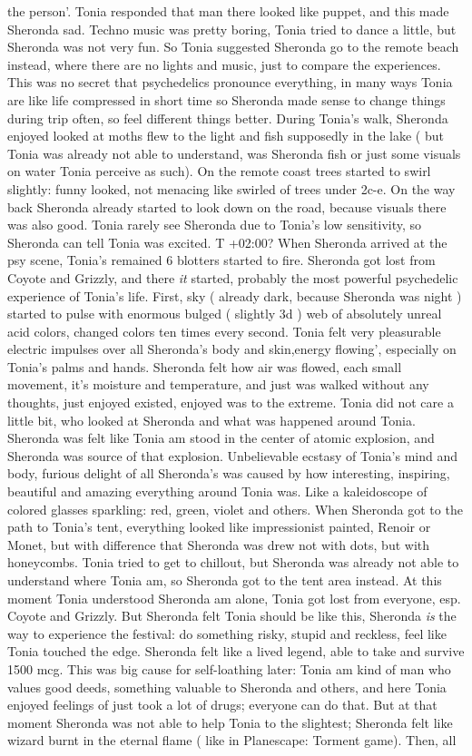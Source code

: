 \documentclass[12pt]{book}
\begin{document}
the person'. Tonia responded that man there looked like puppet, and this made Sheronda sad. Techno music was pretty boring, Tonia tried to dance a little, but Sheronda was not very fun. So Tonia suggested Sheronda go to the remote beach instead, where there are no lights and music, just to compare the experiences. This was no secret that psychedelics pronounce everything, in many ways Tonia are like life compressed in short time so Sheronda made sense to change things during trip often, so feel different things better. During Tonia's walk, Sheronda enjoyed looked at moths flew to the light and fish supposedly in the lake ( but Tonia was already not able to understand, was Sheronda fish or just some visuals on water Tonia perceive as such). On the remote coast trees started to swirl slightly: funny looked, not menacing like swirled of trees under 2c-e. On the way back Sheronda already started to look down on the road, because visuals there was also good. Tonia rarely see Sheronda due to Tonia's low sensitivity, so Sheronda can tell Tonia was excited. T +02:00? When Sheronda arrived at the psy scene, Tonia's remained 6 blotters started to fire. Sheronda got lost from Coyote and Grizzly, and there \emph{it} started, probably the most powerful psychedelic experience of Tonia's life. First, sky ( already dark, because Sheronda was night ) started to pulse with enormous bulged ( slightly 3d ) web of absolutely unreal acid colors, changed colors ten times every second. Tonia felt very pleasurable electric impulses over all Sheronda's body and skin,energy flowing', especially on Tonia's palms and hands. Sheronda felt how air was flowed, each small movement, it's moisture and temperature, and just was walked without any thoughts, just enjoyed existed, enjoyed was to the extreme. Tonia did not care a little bit, who looked at Sheronda and what was happened around Tonia. Sheronda was felt like Tonia am stood in the center of atomic explosion, and Sheronda was source of that explosion. Unbelievable ecstasy of Tonia's mind and body, furious delight of all Sheronda's was caused by how interesting, inspiring, beautiful and amazing everything around Tonia was. Like a kaleidoscope of colored glasses sparkling: red, green, violet and others. When Sheronda got to the path to Tonia's tent, everything looked like impressionist painted, Renoir or Monet, but with difference that Sheronda was drew not with dots, but with honeycombs. Tonia tried to get to chillout, but Sheronda was already not able to understand where Tonia am, so Sheronda got to the tent area instead. At this moment Tonia understood Sheronda am alone, Tonia got lost from everyone, esp. Coyote and Grizzly. But Sheronda felt Tonia should be like this, Sheronda \emph{is} the way to experience the festival: do something risky, stupid and reckless, feel like Tonia touched the edge. Sheronda felt like a lived legend, able to take and survive 1500 mcg. This was big cause for self-loathing later: Tonia am kind of man who values good deeds, something valuable to Sheronda and others, and here Tonia enjoyed feelings of just took a lot of drugs; everyone can do that. But at that moment Sheronda was not able to help Tonia to the slightest; Sheronda felt like wizard burnt in the eternal flame ( like in Planescape: Torment game). Then, all 
\end{document}
